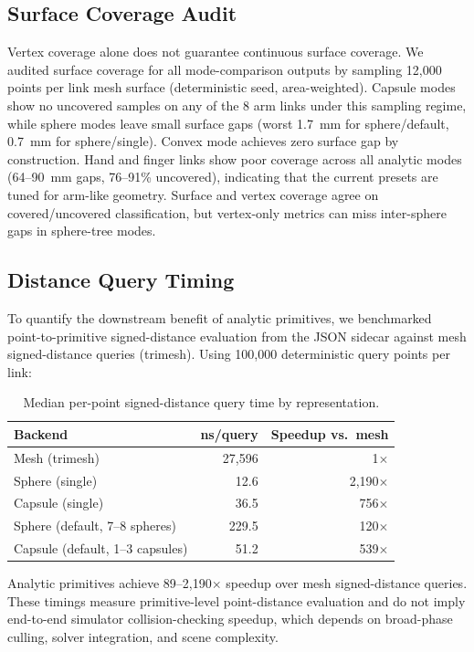 \subsection{Surface Coverage Audit}

Vertex coverage alone does not guarantee continuous surface coverage. We audited surface coverage for all mode-comparison outputs by sampling 12,000 points per link mesh surface (deterministic seed, area-weighted). Capsule modes show no uncovered samples on any of the 8 arm links under this sampling regime, while sphere modes leave small surface gaps (worst 1.7~mm for sphere/default, 0.7~mm for sphere/single). Convex mode achieves zero surface gap by construction. Hand and finger links show poor coverage across all analytic modes (64--90~mm gaps, 76--91\% uncovered), indicating that the current presets are tuned for arm-like geometry. Surface and vertex coverage agree on covered/uncovered classification, but vertex-only metrics can miss inter-sphere gaps in sphere-tree modes.

\subsection{Distance Query Timing}

To quantify the downstream benefit of analytic primitives, we benchmarked point-to-primitive signed-distance evaluation from the JSON sidecar against mesh signed-distance queries (trimesh). Using 100,000 deterministic query points per link:

\begin{table}[t]
\centering
\caption{Median per-point signed-distance query time by representation.}
\label{tab:distance_timing}
\begin{tabular}{@{}lrr@{}}
\toprule
Backend & ns/query & Speedup vs.\ mesh \\
\midrule
Mesh (trimesh) & 27,596 & 1$\times$ \\
Sphere (single) & 12.6 & 2,190$\times$ \\
Capsule (single) & 36.5 & 756$\times$ \\
Sphere (default, 7--8 spheres) & 229.5 & 120$\times$ \\
Capsule (default, 1--3 capsules) & 51.2 & 539$\times$ \\
\bottomrule
\end{tabular}
\end{table}

Analytic primitives achieve 89--2,190$\times$ speedup over mesh signed-distance queries. These timings measure primitive-level point-distance evaluation and do not imply end-to-end simulator collision-checking speedup, which depends on broad-phase culling, solver integration, and scene complexity.


